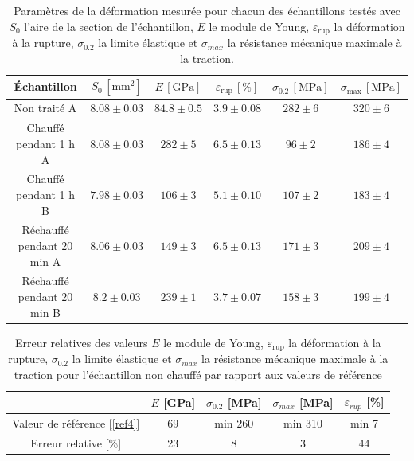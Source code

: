 \documentclass[a4paper, 12pt,oneside]{article}
\begin{document}
\begin{table}[H]
\centering
\begin{tabular}{|c|c|c|c|c|c|}
\hline
Échantillon & \( S_0 \, [\text{mm}^2] \) & \( E \, [\text{GPa}] \) & \( \varepsilon_{\text{rup}}\,[\%]\) & \( \sigma_{0.2} \, [\text{MPa}] \) & \( \sigma_{\text{max}} \, [\text{MPa}] \) \\
\hline
Non traité A & \( 8.08 \pm 0.03 \) & \( 84.8 \pm 0.5 \) & \( 3.9 \pm 0.08 \) & \( 282 \pm 6 \) & \( 320 \pm 6 \) \\
\hline
Chauffé pendant 1 h A & \( 8.08 \pm 0.03 \) & \( 282 \pm 5 \) & \( 6.5 \pm 0.13 \) & \( 96 \pm 2 \) & \( 186 \pm 4 \) \\
\hline
Chauffé pendant 1 h B & \( 7.98 \pm 0.03 \) & \( 106 \pm 3 \) & \( 5.1 \pm 0.10 \) & \( 107 \pm 2 \) & \( 183 \pm 4 \) \\
\hline
Réchauffé pendant 20 min A & \( 8.06 \pm 0.03 \) & \( 149 \pm 3 \) & \( 6.5 \pm 0.13 \) & \( 171 \pm 3 \) & \( 209 \pm 4 \) \\
\hline
Réchauffé pendant 20 min B & \( 8.2 \pm 0.03 \) & \( 239 \pm 1 \) & \( 3.7 \pm 0.07 \) & \( 158 \pm 3 \) & \( 199 \pm 4 \) \\
\hline
\end{tabular}
\caption{Paramètres de la déformation mesurée pour chacun des échantillons testés avec $S_0$ l'aire de la section de l'échantillon, $E$ le module de Young, $\varepsilon_{\text{rup}}$ la déformation à la rupture, $\sigma_{0.2}$ la limite élastique et $\sigma_{max}$ la résistance mécanique maximale à la traction.}
\label{tab1}
\end{table}

\vspace{-0.2cm}

\begin{table}[H]
    \centering
    \begin{tabular}{|c|c|c|c|c|}
        \hline
        & $E$ [GPa] & $\sigma_{0.2}$ [MPa] & $\sigma_{max}$ [MPa] & $\varepsilon_{rup}$ [\%] \\
        \hline
        Valeur de référence [\ref{ref4}] & 69 & min 260 & min 310 & min 7 \\
        \hline
        Erreur relative [\%] & 23 & 8 & 3 & 44 \\
        \hline
    \end{tabular}
    \caption{Erreur relatives des valeurs $E$ le module de Young, $\varepsilon_{\text{rup}}$ la déformation à la rupture, $\sigma_{0.2}$ la limite élastique et $\sigma_{max}$ la résistance mécanique maximale à la traction pour l'échantillon non chauffé par rapport aux valeurs de référence}
    \label{tab2}
\end{table}
\end{document}
